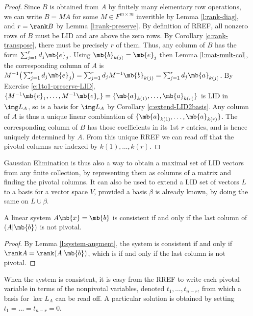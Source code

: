 \begin{proof}
Since $B$ is obtained from $A$ by finitely many elementary row operations, we can write $B=MA$ for some $M \in F^{m \times m}$ inveritble by Lemma \ref{l:rank-diag}, and $r= \rank B$ by Lemma \ref{l:rank-preserve}. By definition of RREF, all nonzero rows of $B$ must be LID and are above the zero rows. By Corollary \ref{c:rank-transpose}, there must be precisely $r$ of them.
Thus, any column of $B$ has the form $\sum_{j=1}^rd_j \mb{e}_j$. Using $\mb{b}_{k(j)}= \mb{e}_j$ then Lemma \ref{l:mat-mult-col}, the corresponding column of $A$ is $M^{-1}\big( \sum_{j=1}^rd_j \mb{e}_j \big)= \sum_{j=1}^rd_j M^{-1}\mb{b}_{k(j)}= \sum_{j=1}^rd_j \mb{a}_{k(j)}$. By Exercise \ref{e:1to1-preserve-LID}, $\{ M^{-1}\mb{e}_1, \ldots,M^{-1}\mb{e}_r \}= \{ \mb{a}_{k(1)}, \ldots,\mb{a}_{k(r)}\}$ is LID in $\img L_A$, so is a basis for $\img L_A$ by Corollary \ref{c:extend-LID2basis}.
Any column of $A$ is thus a unique linear combination of $\{ \mb{a}_{k(1)}, \ldots,\mb{a}_{k(r)}\}$. The corresponding column of $B$ has those coefficients in its 1st $r$ entries, and is hence uniquely determined by $A$. From this unique RREF we can read off that the pivotal columns are indexed by $k(1), \ldots,k(r)$.
\end{proof}
Gaussian Elimination is thus also a way to obtain a maximal set of LID vectors from any finite collection, by representing them as columns of a matrix and finding the pivotal columns. It can also be used to extend a LID set of vectors $L$ to a basis for a vector space $V$, provided a basis $\beta$ is already known, by doing the same on $L \cup \beta$.
\begin{exer}
A linear system $A \mb{x}=\mb{b}$ is consistent if and only if the last column of $(A|\mb{b})$ is not pivotal.
\end{exer}
\begin{proof}
By Lemma \ref{l:system-augment}, the system is consistent if and only if $\rank A= \rank(A|\mb{b})$, which is if and only if the last column is not pivotal.
\end{proof}
When the system is consistent, it is easy from the RREF to write each pivotal variable in terms of the nonpivotal variables, denoted $t_1, \ldots,t_{n-r}$, from which a basis for $\ker L_A$ can be read off. A particular solution is obtained by setting $t_1= \ldots=t_{n-r}=0$.
